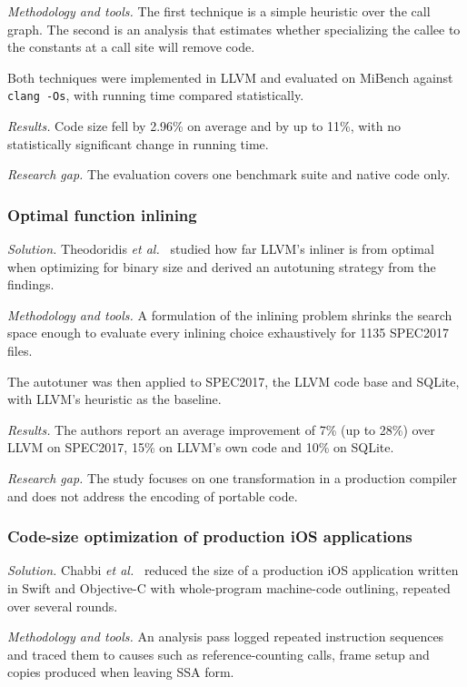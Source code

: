 \documentclass{ieeeaccess}
\begin{document}
\textit{Methodology and tools.} The first technique is a simple heuristic over the call graph. The second is an analysis that estimates whether specializing the callee to the constants at a call site will remove code.

Both techniques were implemented in LLVM and evaluated on MiBench against \texttt{clang -Os}, with running time compared statistically.

\textit{Results.} Code size fell by 2.96\% on average and by up to 11\%, with no statistically significant change in running time.

\textit{Research gap.} The evaluation covers one benchmark suite and native code only.

\subsubsection{Optimal function inlining}
\textit{Solution.} Theodoridis \textit{et al.}~\cite{theodoridis2022inlining} studied how far LLVM's inliner is from optimal when optimizing for binary size and derived an autotuning strategy from the findings.

\textit{Methodology and tools.} A formulation of the inlining problem shrinks the search space enough to evaluate every inlining choice exhaustively for 1135 SPEC2017 files.

The autotuner was then applied to SPEC2017, the LLVM code base and SQLite, with LLVM's heuristic as the baseline.

\textit{Results.} The authors report an average improvement of 7\% (up to 28\%) over LLVM on SPEC2017, 15\% on LLVM's own code and 10\% on SQLite.

\textit{Research gap.} The study focuses on one transformation in a production compiler and does not address the encoding of portable code.

\subsubsection{Code-size optimization of production iOS applications}
\textit{Solution.} Chabbi \textit{et al.}~\cite{chabbi2021ios} reduced the size of a production iOS application written in Swift and Objective-C with whole-program machine-code outlining, repeated over several rounds.

\textit{Methodology and tools.} An analysis pass logged repeated instruction sequences and traced them to causes such as reference-counting calls, frame setup and copies produced when leaving SSA form.
\end{document}
